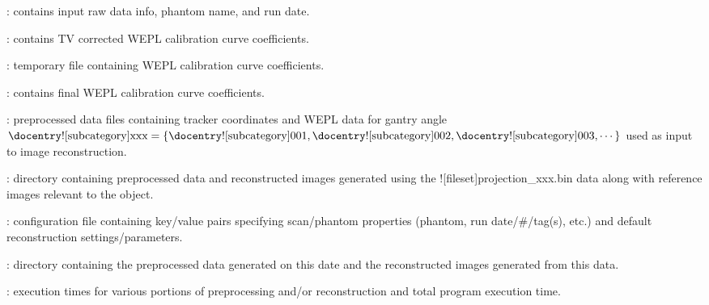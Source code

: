 \begin{tcbenvironment}
\begin{tcbparagraph}
\begin{ThinEnum}
\begin{ThinEnum}
\begin{ThinEnum}
\begin{ThinEnum}
\begin{ThinEnum}
\begin{ThinEnum}
\begin{ThinEnum}
                                \item {} : contains input raw data info, phantom name, and run date.
                    			\item {} : contains TV corrected WEPL calibration curve coefficients.
						\item {} : temporary file containing WEPL calibration curve coefficients.
                                	\item {} : contains final WEPL calibration curve coefficients.
                                \item {} : preprocessed data files containing tracker coordinates and WEPL data for gantry angle $\text{\docentry![subcategory]{xxx}} =\{\text{\docentry![subcategory]{001}}, \text{\docentry![subcategory]{002}}, \text{\docentry![subcategory]{003}}, \cdots\}$ used as input to image reconstruction.                       	
                                \item {} : directory containing preprocessed data and reconstructed images generated using the \docentry![fileset]{projection\_xxx.bin} data along with reference images relevant to the object.
                                	\begin{ThinEnum}
                                    	\item {} : configuration file containing key/value pairs specifying scan/phantom properties
                                    (phantom, run date/\#/tag(s), etc.) and default reconstruction settings/parameters.
\newpage
                    				\item {} : directory containing the preprocessed data generated on this date and the reconstructed images generated from this data.
                                    \begin{ThinEnum}
                                        	\item {} : execution times for various portions of preprocessing and/or reconstruction and total program execution time.

\end{ThinEnum}
\end{ThinEnum}
\end{ThinEnum}
\end{ThinEnum}
\end{ThinEnum}
\end{ThinEnum}
\end{ThinEnum}
\end{ThinEnum}
\end{ThinEnum}
\end{tcbparagraph}
\end{tcbenvironment}
